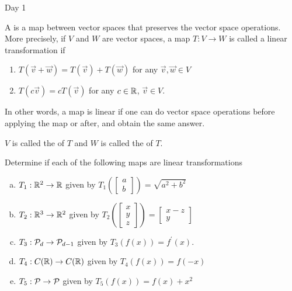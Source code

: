 
\begin{applicationActivities}{Day 1}

\begin{definition}
A  is a map between vector spaces that preserves the vector space operations.  More precisely, if $V$ and $W$ are vector spaces, a map $T:V\rightarrow W$ is called a linear transformation if
\begin{enumerate}
\item $T(\vec{v}+\vec{w}) = T(\vec{v})+T(\vec{w})$ for any $\vec{v},\vec{w} \in V$
\item $T(c\vec{v}) = cT(\vec{v})$ for any $c \in \IR$, $\vec{v} \in V$.
\end{enumerate}
In other words, a map is linear if one can do vector space operations before applying the map or after, and obtain the same answer.

$V$ is called the  of $T$ and $W$ is called the  of $T$.
\end{definition}

\begin{activity}{0}
Determine if each of the following maps are linear transformations
\begin{enumerate}[(a)]
\item $T_1 : \IR^2 \rightarrow \IR$ given by $T_1\left(\begin{bmatrix} a \\ b \end{bmatrix} \right) = \sqrt{a^2+b^2}$
\item $T_2 : \IR^3 \rightarrow \IR^2$ given by $T_2\left(\begin{bmatrix} x \\ y \\ z \end{bmatrix} \right) = \begin{bmatrix} x-z \\ y \end{bmatrix}$
\item $T_3: \P_d \rightarrow \P_{d-1}$ given by $T_3(f(x)) = f^\prime(x)$.
\item $T_4: C(\IR) \rightarrow C(\IR)$ given by $T_4(f(x)) = f(-x)$
\item $T_5: \P \rightarrow \P$ given by $T_5(f(x)) = f(x)+x^2$
\end{enumerate}
\end{activity}


\end{applicationActivities}
